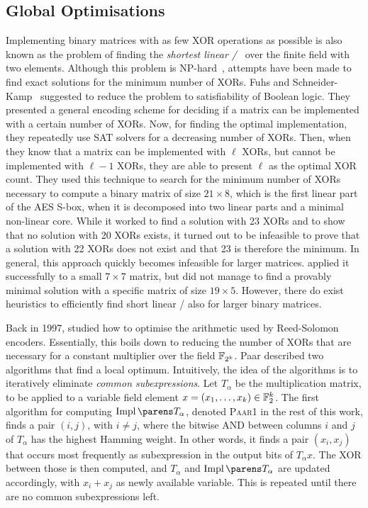 \subsection{Global Optimisations}
\label{slps:subsec:xor2}
Implementing binary matrices with as few XOR operations as possible is also known as the problem of finding the \emph{shortest linear \SLP/}~\cite{SAT:FuhSch10,JC:BoyMatPer13} over the finite field with two elements.
Although this problem is NP-hard~\cite{MFCS:BoyMatPer08,JC:BoyMatPer13}, attempts have been made to find exact solutions for the minimum number of XORs.
Fuhs and Schneider-Kamp~\cite{IWIL:FuhSch10,SAT:FuhSch10} suggested to reduce the problem to satisfiability of Boolean logic.
They presented a general encoding scheme for deciding if a matrix can be implemented with a certain number of XORs.
Now, for finding the optimal implementation, they repeatedly use SAT solvers for a decreasing number of XORs.
Then, when they know that a matrix can be implemented with $\ell$ XORs, but cannot be implemented with $\ell - 1$ XORs, they are able to present $\ell$ as the optimal XOR count.
They used this technique to search for the minimum number of XORs necessary to compute a binary matrix of size $21 \times 8$, which is the first linear part of the AES S-box, when it is decomposed into two linear parts and a minimal non-linear core.
While it worked to find a solution with 23 XORs and to show that no solution with 20 XORs exists, it turned out to be infeasible to prove that a solution with 22 XORs does not exist and that 23 is therefore the minimum.
In general, this approach quickly becomes infeasible for larger matrices.
\textcite{FSE:Stoffelen16} applied it successfully to a small $7 \times 7$ matrix, but did not manage to find a provably minimal solution with a specific matrix of size $19 \times 5$.
However, there do exist heuristics to efficiently find short linear \SLPp/ also for larger binary matrices.

Back in 1997, \textcite{ISIT:Paar97} studied how to optimise the arithmetic used by Reed-Solomon encoders.
Essentially, this boils down to reducing the number of XORs that are necessary for a constant multiplier over the field $\mathbb{F}_{2^k}$.
Paar described two algorithms that find a local optimum.
Intuitively, the idea of the algorithms is to iteratively eliminate \emph{common subexpressions}.
Let $T_{\alpha}$ be the multiplication matrix, to be applied to a variable field element $x = \left( x_1, \dotsc, x_k \right) \in \mathbb{F}_2^k$.
The first algorithm for computing $\impl{T_{\alpha}}$, denoted \textsc{Paar1} in the rest of this work, finds a pair $(i,j)$, with $i \neq j$, where the bitwise AND between columns $i$ and $j$ of $T_\alpha$ has the highest Hamming weight.
In other words, it finds a pair $(x_i, x_j)$ that occurs most frequently as subexpression in the output bits of $T_{\alpha}x$.
The XOR between those is then computed, and $T_{\alpha}$ and $\impl{T_{\alpha}}$ are updated accordingly, with $x_i + x_j$ as newly available variable.
This is repeated until there are no common subexpressions left.


